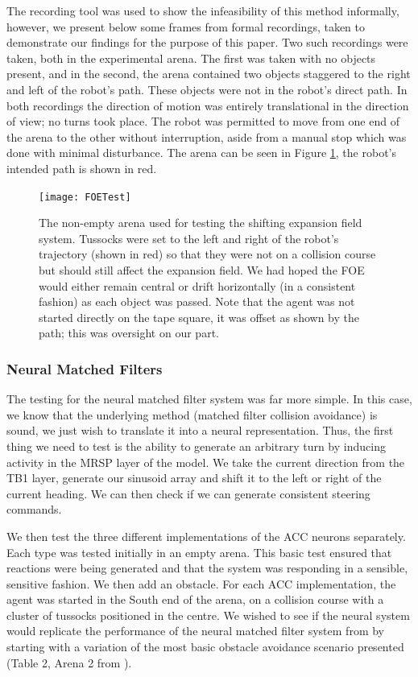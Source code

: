 \documentclass[a4paper,11pt,twoside,openright]{article}
\begin{document}
The recording tool was used to show the infeasibility of this method
informally, however, we present below some frames from formal
recordings, taken to demonstrate our findings for the purpose of this
paper. Two such recordings were taken, both in the experimental
arena. The first was taken with no objects present, and in the second, the
arena contained two objects staggered to the right and left of the
robot's path. These objects were not in the robot's direct path.
In both recordings the direction of motion was entirely
translational in the direction of view; no turns took place. The robot
was permitted to move from one end of the arena to the other without
interruption, aside from a manual stop which was done with minimal
disturbance. The arena can be seen in Figure \ref{fig:foetest}, the
robot's intended path is shown in red.

\begin{figure}[h!]
  \centering
  \texttt{[image: FOETest]}
  \caption{\label{fig:foetest} The non-empty arena used for testing
    the shifting expansion field system. Tussocks were set to the left
    and right of the robot's trajectory (shown in red) so that they
    were not on a collision course but should still affect the
    expansion field. We had hoped the FOE would either remain central
    or drift horizontally (in a consistent fashion) as each object was
    passed. Note that the agent was not started directly on the tape
    square, it was offset as shown by the path; this was oversight on
    our part.  }
\end{figure}

\subsubsection{Neural Matched Filters}
The testing for the neural matched filter system was far more
simple. In this case, we know that the underlying method (matched
filter collision avoidance) is sound, we just wish to translate it
into a neural representation. Thus, the first thing we need to test is
the ability to generate an arbitrary turn by inducing activity in the
MRSP layer of the model. We take the current direction from the TB1
layer, generate our sinusoid array and shift it to the left or right of the
current heading. We can then check if we can generate consistent
steering commands.
\newline
\par

We then test the three different implementations of the ACC neurons
separately. Each type was tested initially in an empty arena. This
basic test ensured that reactions were being generated and that the
system was responding in a sensible, sensitive fashion. We then add an
obstacle.  For each ACC implementation, the agent was started in the South
end of the arena, on a collision course with a cluster of tussocks
positioned in the centre. We wished to see if the neural system would
replicate the performance of the neural matched filter system from
\cite{Mitchell2018} by starting with a variation of the most basic
obstacle avoidance scenario presented (Table 2, Arena 2 from
\cite{Mitchell2018}).
\newline\par
\end{document}
